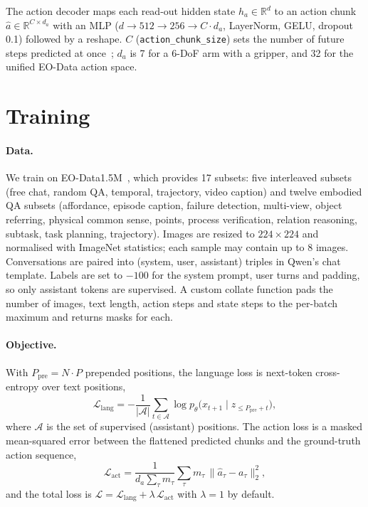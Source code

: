 \documentclass[11pt]{article}
\begin{document}
The action decoder maps each read-out hidden state $h_a\in\mathbb{R}^{d}$ to an action chunk
$\hat a\in\mathbb{R}^{C\times d_a}$ with an MLP ($d\to512\to256\to C\cdot d_a$, LayerNorm,
GELU, dropout 0.1) followed by a reshape. $C$ (\texttt{action\_chunk\_size}) sets the number
of future steps predicted at once~\cite{zhao2023aloha}; $d_a$ is 7 for a 6-DoF arm with a
gripper, and 32 for the unified EO-Data action space.

\section{Training}
\label{sec:training}

\paragraph{Data.} We train on EO-Data1.5M~\cite{qu2025eo1}, which provides 17 subsets:
five interleaved subsets (free chat, random QA, temporal, trajectory, video caption) and
twelve embodied QA subsets (affordance, episode caption, failure detection, multi-view,
object referring, physical common sense, points, process verification, relation reasoning,
subtask, task planning, trajectory). Images are resized to $224\times224$ and normalised
with ImageNet statistics; each sample may contain up to 8 images. Conversations are paired
into (system, user, assistant) triples in Qwen's chat template. Labels are set to $-100$ for
the system prompt, user turns and padding, so only assistant tokens are supervised. A custom
collate function pads the number of images, text length, action steps and state steps to the
per-batch maximum and returns masks for each.

\paragraph{Objective.} With $P_{\text{pre}}=N\cdot P$ prepended positions, the language loss
is next-token cross-entropy over text positions,
\begin{equation}
  \mathcal L_{\text{lang}} = -\frac{1}{|\mathcal A|}\sum_{t\in\mathcal A}\log p_\theta\big(x_{t+1}\mid z_{\le P_{\text{pre}}+t}\big),
\end{equation}
where $\mathcal A$ is the set of supervised (assistant) positions. The action loss is a
masked mean-squared error between the flattened predicted chunks and the ground-truth action
sequence,
\begin{equation}
  \mathcal L_{\text{act}} = \frac{1}{d_a\sum_\tau m_\tau}\sum_{\tau} m_\tau\,\lVert \hat a_\tau - a_\tau\rVert_2^2,
\end{equation}
and the total loss is $\mathcal L=\mathcal L_{\text{lang}}+\lambda\,\mathcal L_{\text{act}}$
with $\lambda=1$ by default.
\end{document}
